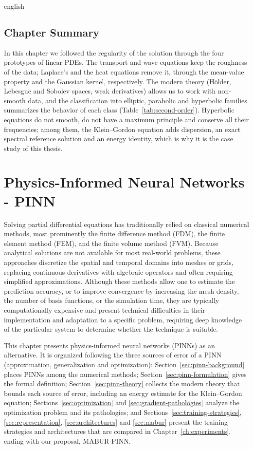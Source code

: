\documentclass[11pt,letterpaper,twoside,openright]{book} %
\begin{document}
\begin{hyphenrules}{english}
\section{Chapter Summary}\label{sec:ch2-summary}

In this chapter we followed the regularity of the solution through the four prototypes of linear PDEs.
The transport and wave equations keep the roughness of the data; Laplace's and the heat equations remove
it, through the mean-value property and the Gaussian kernel, respectively. The modern theory (Hölder,
Lebesgue and Sobolev spaces, weak derivatives) allows us to work with non-smooth data, and the
classification into elliptic, parabolic and hyperbolic families summarizes the behavior of each class
(Table~\ref{tab:second-order}). Hyperbolic equations do not smooth, do not have a maximum principle and
conserve all their frequencies; among them, the Klein--Gordon equation adds dispersion, an exact
spectral reference solution and an energy identity, which is why it is the case study of this thesis.

\chapter{Physics-Informed Neural Networks - PINN}\label{ch:pinns}

Solving partial differential equations has traditionally relied on classical numerical methods, most
prominently the finite difference method (FDM), the finite element method (FEM), and the finite volume
method (FVM). Because analytical solutions are not available for most real-world problems, these
approaches discretize the spatial and temporal domains into meshes or grids, replacing continuous
derivatives with algebraic operators and often requiring simplified approximations. Although these
methods allow one to estimate the prediction accuracy, or to improve convergence by increasing the
mesh density, the number of basis functions, or the simulation time, they are typically computationally
expensive and present technical difficulties in their implementation and adaptation to a specific
problem, requiring deep knowledge of the particular system to determine whether the technique is
suitable.

This chapter presents physics-informed neural networks (PINNs) as an alternative. It is organized
following the three sources of error of a PINN (approximation, generalization and optimization):
Section~\ref{sec:pinn-background} places PINNs among the numerical methods; Section~\ref{sec:pinn-formulation}
gives the formal definition; Section~\ref{sec:pinn-theory} collects the modern theory that bounds each source
of error, including an energy estimate for the Klein--Gordon equation; Sections~\ref{sec:optimization} and \ref{sec:gradient-pathologies}
analyze the optimization problem and its pathologies; and
Sections~\ref{sec:training-strategies}, \ref{sec:representation}, \ref{sec:architectures} and \ref{sec:mabur} present the training
strategies and architectures that are compared in Chapter~\ref{ch:experiments}, ending with our proposal,
MABUR-PINN.


\end{hyphenrules}
\end{document}

